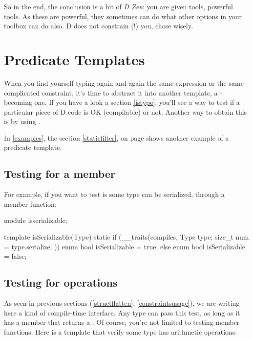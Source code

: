 So in the end, the conclusion is a bit of \emph{D Zen}: you are given tools, powerful tools. As these are powerful, they sometimes can do what other options in your toolbox can do also. D does not constrain (!) you, chose wisely.

\section{Predicate Templates}\label{predicates}

When you find yourself typing again and again the same  expression or the same complicated constraint, it's time to abstract it into another template, a -becoming one. If you have a look a section \ref{istype}, you'll see a way to test if a particular piece of D code is OK (compilable) or not. Another way to obtain this is by using .

In \autoref{examples}, the section \ref{staticfilter}, on page \pageref{graphcheck} shows another example of a predicate template.

\subsection{Testing for a member}

For example, if you want to test is some type can be serialized, through a  member function:

\begin{dcode}
module isserializable;

template isSerializable(Type)
{
    static if (__traits(compiles, {
                                   Type type;
                                   size_t num = type.serialize;
                                  }))
        enum bool isSerializable = true;
    else
        enum bool isSerializable = false;
}
\end{dcode}

\subsection{Testing for operations}

As seen in previous sections (\ref{structflatten}, \ref{constraintsusage}), we are writing here a kind of compile-time interface. Any type can pass this test, as long as it has a  member that returns a . Of course, you're not limited to testing member functions. Here is a template that verify some type has arithmetic operations:

